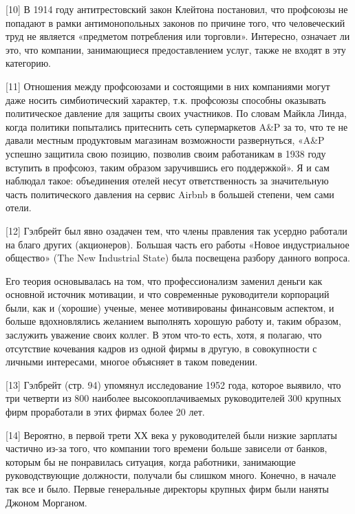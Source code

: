 \documentclass[ebook,12pt,oneside,openany]{memoir}
\begin{document}
[10] В 1914 году антитрестовский закон Клейтона постановил, что
профсоюзы не попадают в рамки антимонопольных законов по причине того,
что человеческий труд не является «предметом потребления или
торговли». Интересно, означает ли это, что компании, занимающиеся
предоставлением услуг, также не входят в эту категорию. \newline

[11] Отношения между профсоюзами и состоящими в них компаниями могут
даже носить симбиотический характер, т.к. профсоюзы способны оказывать
политическое давление для защиты своих участников. По словам Майкла
Линда, когда политики попытались притеснить сеть супермаркетов A\&P за
то, что те не давали местным продуктовым магазинам возможности
развернуться, «A\&P успешно защитила свою позицию, позволив своим
работаникам в 1938 году вступить в профсоюз, таким образом заручившись
его поддержкой». Я и сам наблюдал такое: объединения отелей несут
ответственность за значительную часть политического давления на сервис
Airbnb в большей степени, чем сами отели. \newline

[12] Гэлбрейт был явно озадачен тем, что члены правления так усердно
работали на благо других (акционеров). Большая часть его работы «Новое
индустриальное общество» (The New Industrial State) была посвещена
разбору данного вопроса. \newline

Его теория основывалась на том, что профессионализм заменил деньги как
основной источник мотивации, и что современные руководители корпораций
были, как и (хорошие) ученые, менее мотивированы финансовым аспектом,
и больше вдохновлялись желанием выполнять хорошую работу и, таким
образом, заслужить уважение своих коллег. В этом что-то есть, хотя, я
полагаю, что отсутствие кочевания кадров из одной фирмы в другую, в
совокупности с личными интересами, многое объясняет в таком поведении. \newline

[13] Гэлбрейт (стр. 94) упомянул исследование 1952 года, которое
выявило, что три четверти из 800 наиболее высокооплачиваемых
руководителей 300 крупных фирм проработали в этих фирмах более 20 лет. \newline

[14] Вероятно, в первой трети ХХ века у руководителей были низкие
зарплаты частично из-за того, что компании того времени больше
зависели от банков, которым бы не понравилась ситуация, когда
работники, занимающие руководствующие должности, получали бы слишком
много. Конечно, в начале так все и было. Первые генеральные директоры
крупных фирм были наняты Джоном Морганом. \newline
\end{document}
